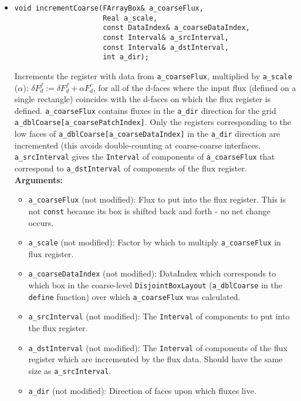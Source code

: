 \begin{itemize}
\item
\begin{verbatim}
void incrementCoarse(FArrayBox& a_coarseFlux,
                     Real a_scale,
                     const DataIndex& a_coarseDataIndex,
                     const Interval& a_srcInterval,
                     const Interval& a_dstInterval,
                     int a_dir);
\end{verbatim}
Increments the register with data from \verb/a_coarseFlux/, multiplied by 
\verb/a_scale/ ($\alpha$):
$\delta F^f_d := \delta F^f_d + \alpha F^c_d$, for all of the d-faces where
the input flux (defined on a single rectangle) coincides with the d-faces on
which the flux register is defined. \verb/a_coarseFlux/ contains fluxes in
the \verb/a_dir/ direction for the grid \verb/a_dblCoarse[a_coarsePatchIndex]/.
Only the registers corresponding to the low faces of
\verb/a_dblCoarse[a_coarseDataIndex]/ in the \verb/a_dir/ direction
are incremented (this avoids double-counting at coarse-coarse interfaces.
\verb/a_srcInterval/ gives the \verb/Interval/ of components of
\verb/a_coarseFlux/ that correspond to \verb/a_dstInterval/ of components
of the flux register.
\\ {\bf Arguments:} 
  \begin{itemize}
  \item
  \verb/a_coarseFlux/ (not modified):
  Flux to put into the flux register.
  This is not \verb/const/ because its box is shifted back and forth -
  no net change occurs.
  \item
  \verb/a_scale/ (not modified):
  Factor by which to multiply \verb/a_coarseFlux/ in flux register.
  \item
  \verb/a_coarseDataIndex/ (not modified):
  DataIndex which corresponds to which box in the coarse-level
  \verb/DisjointBoxLayout/ (\verb/a_dblCoarse/ in the \verb/define/
  function) over which \verb/a_coarseFlux/ was calculated.
  \item
  \verb/a_srcInterval/ (not modified):
  The \verb/Interval/ of components to put into the flux register.
  \item
  \verb/a_dstInterval/ (not modified):
  The \verb/Interval/ of components of the flux register which are
  incremented by the flux data. Should have the same size as
  \verb/a_srcInterval/. 
  \item
  \verb/a_dir/ (not modified):
  Direction of faces upon which fluxes live.
  \end{itemize}


\end{itemize}
